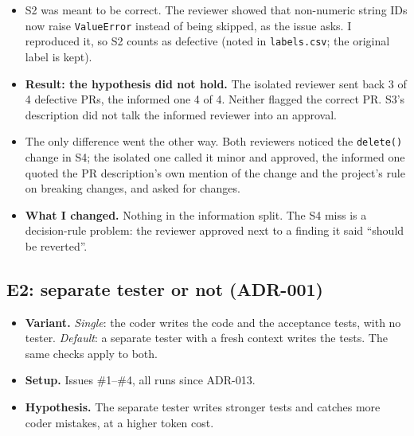 \documentclass[11pt,a4paper]{article}
\newcommand{\code}[1]{\texttt{#1}}
\begin{document}
\begin{itemize}
  \item S2 was meant to be correct. The reviewer showed that non-numeric string IDs now raise
        \code{ValueError} instead of being skipped, as the issue asks. I reproduced it, so S2 counts as defective
        (noted in \code{labels.csv}; the original label is kept).
  \item \textbf{Result: the hypothesis did not hold.} The isolated reviewer sent back 3 of 4 defective PRs,
        the informed one 4 of 4. Neither flagged the correct PR. S3's description did not talk the informed
        reviewer into an approval.
  \item The only difference went the other way. Both reviewers noticed the \code{delete()} change in S4; the
        isolated one called it minor and approved, the informed one quoted the PR description's own mention of
        the change and the project's rule on breaking changes, and asked for changes.
  \item \textbf{What I changed.} Nothing in the information split. The S4 miss is a decision-rule problem:
        the reviewer approved next to a finding it said ``should be reverted''.
\end{itemize}

\subsection{E2: separate tester or not (ADR-001)}
\begin{itemize}
  \item \textbf{Variant.} \emph{Single}: the coder writes the code and the acceptance tests, with no tester.
        \emph{Default}: a separate tester with a fresh context writes the tests. The same checks apply to both.
  \item \textbf{Setup.} Issues \#1--\#4, all runs since ADR-013.
  \item \textbf{Hypothesis.} The separate tester writes stronger tests and catches more coder mistakes, at
        a higher token cost.
\end{itemize}
\end{document}

